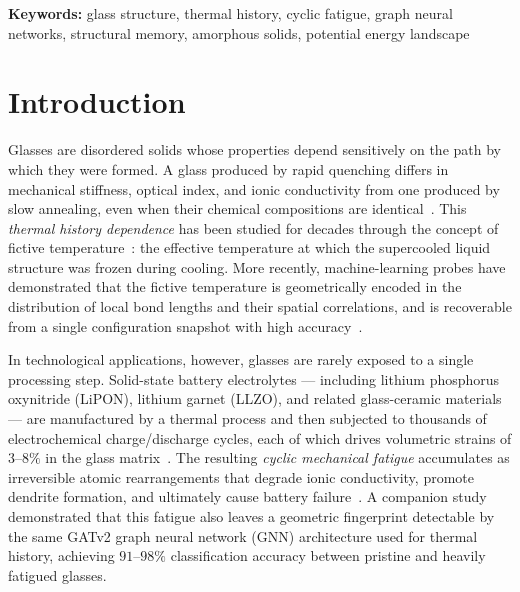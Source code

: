 \documentclass[12pt,a4paper]{article}
\begin{document}
\begin{titlepage}
\vspace{1cm}

\noindent\textbf{Keywords:} glass structure, thermal history, cyclic fatigue, graph neural networks, structural memory, amorphous solids, potential energy landscape

\end{titlepage}

\section{Introduction}
\label{sec:intro}

Glasses are disordered solids whose properties depend sensitively on the path by which they were formed.
A glass produced by rapid quenching differs in mechanical stiffness, optical index, and ionic conductivity from one produced by slow annealing, even when their chemical compositions are identical~\cite{Debenedetti2001,Angell1995,Berthier2011}.
This \textit{thermal history dependence} has been studied for decades through the concept of fictive temperature~\cite{Tool1946,Narayanaswamy1971}: the effective temperature at which the supercooled liquid structure was frozen during cooling.
More recently, machine-learning probes have demonstrated that the fictive temperature is geometrically encoded in the distribution of local bond lengths and their spatial correlations, and is recoverable from a single configuration snapshot with high accuracy~\cite{Singh2025Paper1}.

In technological applications, however, glasses are rarely exposed to a single processing step.
Solid-state battery electrolytes — including lithium phosphorus oxynitride (LiPON), lithium garnet (LLZO), and related glass-ceramic materials — are manufactured by a thermal process and then subjected to thousands of electrochemical charge/discharge cycles, each of which drives volumetric strains of $3$--$8\%$ in the glass matrix~\cite{Janek2016,Yu2017,Sakamoto2013}.
The resulting \textit{cyclic mechanical fatigue} accumulates as irreversible atomic rearrangements that degrade ionic conductivity, promote dendrite formation, and ultimately cause battery failure~\cite{Porz2017,Zhao2020,Swamy2018}.
A companion study~\cite{Singh2025Paper2} demonstrated that this fatigue also leaves a geometric fingerprint detectable by the same GATv2 graph neural network (GNN) architecture used for thermal history, achieving $91$--$98\%$ classification accuracy between pristine and heavily fatigued glasses.
\end{document}

